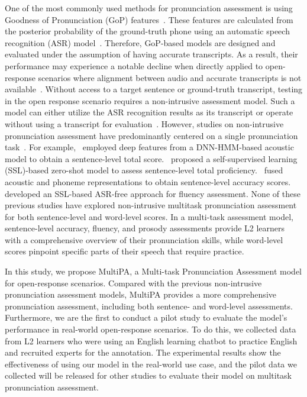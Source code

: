 \documentclass{Interspeech2024}
\begin{document}
One of the most commonly used methods for pronunciation assessment is using Goodness of Pronunciation (GoP) features~\cite{gong2022transformer, liu2023leveraging, sheoran2023pronunciation, pei2023gradformer, chao2023hierarchical, shekar2023assessment}. These features are calculated from the posterior probability of the ground-truth phone using an automatic speech recognition (ASR) model~\cite{hu2015improved}. Therefore, GoP-based models are designed and evaluated under the assumption of having accurate transcripts. As a result, their performance may experience a notable decline when directly applied to open-response scenarios where alignment between audio and accurate transcripts is not available~\cite{liang2023end}. Without access to a target sentence or ground-truth transcript, testing in the open response scenario requires a non-intrusive assessment model. Such a model can either utilize the ASR recognition results as its transcript or operate without using a transcript for evaluation~\cite{zhang2021end, zezario2022mti, chen22i_interspeech}. However, studies on non-intrusive pronunciation assessment have predominantly centered on a single pronunciation task~\cite{chung2017spoken, mao2019nn, fontan2020using}. For example,~\cite{lin2021deep} employed deep features from a DNN-HMM-based acoustic model to obtain a sentence-level total score.~\cite{liu2023zero} proposed a self-supervised learning (SSL)-based zero-shot model to assess sentence-level total proficiency.~\cite{lin2023exploiting} fused acoustic and phoneme representations to obtain sentence-level accuracy scores.~\cite{liu2023asr} developed an SSL-based ASR-free approach for fluency assessment. None of these previous studies have explored non-intrusive multitask pronunciation assessment for both sentence-level and word-level scores. In a multi-task assessment model, sentence-level accuracy, fluency, and prosody assessments provide L2 learners with a comprehensive overview of their pronunciation skills, while word-level scores pinpoint specific parts of their speech that require practice.

In this study, we propose MultiPA, a Multi-task Pronunciation Assessment model for open-response scenarios. Compared with the previous non-intrusive pronunciation assessment models, MultiPA provides a more comprehensive pronunciation assessment, including both sentence- and word-level assessments. Furthermore, we are the first to conduct a pilot study to evaluate the model's performance in real-world open-response scenarios. To do this, we collected data from L2 learners who were using an English learning chatbot to practice English and recruited experts for the annotation. The experimental results show the effectiveness of using our model in the real-world use case, and the pilot data we collected will be released for other studies to evaluate their model on multitask pronunciation assessment. 
\end{document}
